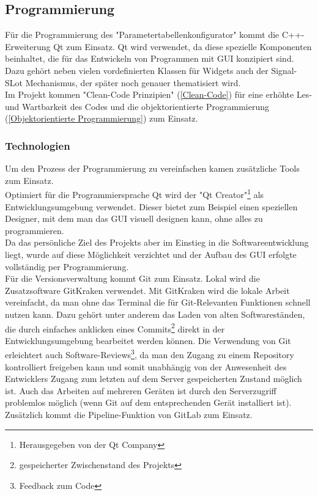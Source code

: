 \documentclass[a4paper,12pt,top=2.5cm,bottom=2.5cm, left=2.5cm, right=2.5cm, numbers=noenddot]{scrartcl}
\begin{document}
\subsection{Programmierung}
Für die Programmierung des "Parametertabellenkonfigurator" kommt die C++-Erweiterung Qt zum Einsatz. Qt wird verwendet, da diese spezielle Komponenten beinhaltet, die für das Entwickeln von Programmen mit GUI konzipiert sind. Dazu gehört neben vielen vordefinierten Klassen für Widgets auch der Signal-SLot Mechanismus, der später noch genauer thematisiert wird.\\
Im Projekt kommen "Clean-Code Prinzipien" (\ref{Clean-Code}) für eine erhöhte Les- und Wartbarkeit des Codes und die objektorientierte Programmierung (\ref{Objektorientierte Programmierung}) zum Einsatz.
\subsubsection{Technologien} 
Um den Prozess der Programmierung zu vereinfachen kamen zusätzliche Tools zum Einsatz. \\
Optimiert für die Programmiersprache Qt wird der "Qt Creator"\footnote{Herausgegeben von der Qt Company} als Entwicklungsumgebung verwendet. Dieser bietet zum Beispiel einen speziellen Designer, mit dem man das GUI visuell designen kann, ohne alles zu programmieren. \\
Da das persönliche Ziel des Projekts aber im Einstieg in die Softwareentwicklung liegt, wurde auf diese Möglichkeit verzichtet und der Aufbau des GUI erfolgte vollständig per Programmierung. \\
Für die Versionsverwaltung kommt Git zum Einsatz. Lokal wird die Zusatzsoftware GitKraken verwendet. Mit GitKraken wird die lokale Arbeit vereinfacht, da man ohne das Terminal die für Git-Relevanten Funktionen schnell nutzen kann. Dazu gehört unter anderem das Laden von alten Softwareständen, die durch einfaches anklicken eines Commits\footnote{gespeicherter Zwischenstand des Projekts} direkt in der Entwicklungsumgebung bearbeitet werden können. 
Die Verwendung von Git erleichtert auch Software-Reviews\footnote{Feedback zum Code}, da man den Zugang zu einem Repository kontrolliert freigeben kann und somit unabhängig von der Anwesenheit des Entwicklers Zugang zum letzten auf dem Server gespeicherten Zustand möglich ist. Auch das Arbeiten auf mehreren Geräten ist durch den Serverzugriff problemlos möglich (wenn Git auf dem entsprechenden Gerät installiert ist).\\
Zusätzlich kommt die Pipeline-Funktion von GitLab zum Einsatz. \\
\end{document}

